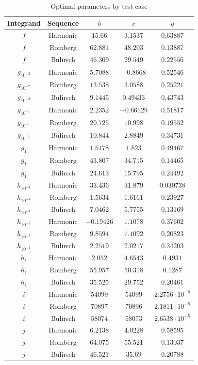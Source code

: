 \begin{table}[H]
    \centering
    \begin{tabular}{c|c||c|c|c}
        Integrand & Sequence & \(b\) & \(c\) & \(q\) \\\hline\hline
$f$ & Harmonic & \(15.66\) & \(3.1537\) & \(0.63887\) \\
$f$ & Romberg & \(62.881\) & \(48.203\) & \(0.13887\)\\
$f$ & Bulirsch & \(46.309\) & \(29.549\) & \(0.22556\)\\
$g_{10^{-2}}$ & Harmonic & \(5.7088\) & \(-0.8668\) & \(0.52546\)\\
$g_{10^{-2}}$ & Romberg & \(13.538\) & \(3.0588\) & \(0.25221\)\\
$g_{10^{-2}}$ & Bulirsch & \(9.1445\) & \(0.49433\) & \(0.43743\)\\
$g_{10^{-1}}$ & Harmonic & \(2.2352\) & \(-0.66129\) & \(0.51817\)\\
$g_{10^{-1}}$ & Romberg & \(20.725\) & \(10.998\) & \(0.19552\)\\
$g_{10^{-1}}$ & Bulirsch & \(10.844\) & \(2.8849\) & \(0.34731\)\\
$g_1$ & Harmonic & \(1.6178\) & \(1.823\) & \(0.49467\)\\
$g_1$ & Romberg & \(43.807\) & \(34.715\) & \(0.14465\)\\
$g_1$ & Bulirsch & \(24.613\) & \(15.795\) & \(0.24492\) \\
$h_{10^{-4}}$ & Harmonic & \(33.436\) & \(31.879\) & \(0.030738\)\\
$h_{10^{-4}}$ & Romberg & \(1.5634\) & \(1.6161\) & \(0.23927\)\\
$h_{10^{-4}}$ & Bulirsch & \(7.0462\) & \(5.7755\) & \(0.13169\)\\
$h_{10^{-2}}$ & Harmonic & \(-0.19426\) & \(1.1078\) & \(0.37602\) \\
$h_{10^{-2}}$ & Romberg & \(9.8594\) & \(7.1092\) & \(0.20823\)\\
$h_{10^{-2}}$ & Bulirsch & \(2.2519\) & \(2.0217\) & \(0.34203\) \\
$h_1$ & Harmonic & \(2.052\) & \(4.6543\) & \(0.4931\)\\
$h_1$ & Romberg & \(55.957\) & \(50.318\) & \(0.1287\)\\
$h_1$ & Bulirsch & \(35.525\) & \(29.752\) & \(0.20461\) \\
$i$ & Harmonic & \(54099\) & \(54099\) & \(2.2756\cdot 10^{-5}\) \\
$i$ & Romberg & \(70897\) & \(70896\) & \(2.1811\cdot 10^{-5}\) \\
$i$ & Bulirsch & \(58074\) & \(58073\) & \(2.6538\cdot 10^{-5}\)\\
$j$ & Harmonic & \(6.2138\) & \(4.0228\) & \(0.58595\) \\
$j$ & Romberg & \(64.075\) & \(55.521\) & \(0.13037\)\\
$j$ & Bulirsch & \(46.521\) & \(35.69\) & \(0.20788\)\\
    \end{tabular}
    \caption{Optimal parameters by test case}
    \label{tab:my_label}
\end{table}

